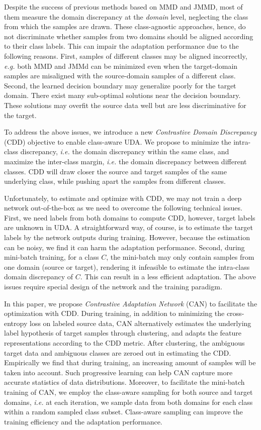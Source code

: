 \documentclass[conference]{IEEEtran}
\begin{document}
Despite the success of previous methods based on MMD and JMMD, most of them measure the domain discrepancy at the \textit{domain} level, neglecting the class from which the samples are drawn.
These class-agnostic approaches, hence, do not discriminate whether samples from two domains should be aligned according to their class labels.
This can impair the adaptation performance due to the following reasons. First, samples of different classes may be aligned incorrectly, \textit{e.g.} both MMD and JMMd can be minimized even when the target-domain samples are misaligned with the source-domain samples of a different class.
Second, the learned decision boundary may generalize poorly for the target domain. There exist many sub-optimal solutions near the decision boundary. These solutions may overfit the source data well but are less discriminative for the target.

To address the above issues, we introduce a new \textit{Contrastive Domain Discrepancy} (CDD) objective to enable class-aware UDA.
We propose to minimize the intra-class discrepancy, \textit{i.e.} the domain discrepancy within the same class, and maximize the inter-class margin, \textit{i.e.} the domain discrepancy between different classes.
CDD will draw closer the source and target samples of the same underlying class, while pushing apart the samples from different classes.

Unfortunately, to estimate and optimize with CDD, we may not train a deep network out-of-the-box as we need to overcome the following technical issues.
First, we need labels from both domains to compute CDD, however, target labels are unknown in UDA. A straightforward way, of course, is to estimate the target labels by the network outputs during training.
However, because the estimation can be noisy, we find it can harm the adaptation performance.
Second, during mini-batch training, for a class $C$, the mini-batch may only contain samples from one domain (source or target), rendering it infeasible to estimate the intra-class domain discrepancy of $C$.
This can result in a less efficient adaptation. The above issues require special design of the network and the training paradigm.

In this paper, we propose \textit{Contrastive Adaptation Network} (CAN) to facilitate the optimization with CDD. During training, in addition to minimizing the cross-entropy loss on labeled source data, CAN alternatively estimates the underlying label hypothesis of target samples through clustering, and adapts the feature representations according to the CDD metric.
After clustering, the ambiguous target data and ambiguous classes are zeroed out in estimating the CDD.
Empirically we find that during training, an increasing amount of samples will be taken into account.
Such progressive learning can help CAN capture more accurate statistics of data distributions.
Moreover, to facilitate the mini-batch training of CAN, we employ the class-aware sampling for both source and target domains, \textit{i.e.} at each iteration, we sample data from both domains for each class within a random sampled class subset.
Class-aware sampling can improve the training efficiency and the adaptation performance.
\end{document}
